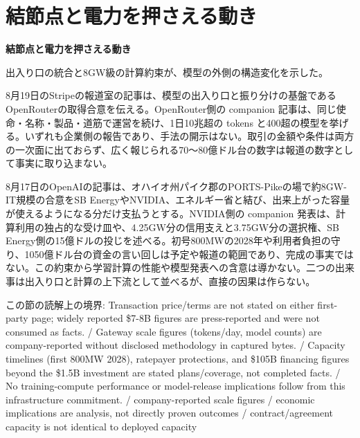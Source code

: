 \section{結節点と電力を押さえる動き}
\begin{wideflow}
{\Large\bfseries 結節点と電力を押さえる動き}\par
\smallskip
{\color{SurveyMuted}出入り口の統合と8GW級の計算約束が、模型の外側の構造変化を示した。}\par
\end{wideflow}

\noindent 8月19日のStripeの報道室の記事は、模型の出入り口と振り分けの基盤であるOpenRouterの取得合意を伝える。OpenRouter側の companion 記事は、同じ使命・名称・製品・道筋で運営を続け、1日10兆超の tokens と400超の模型を挙げる。いずれも企業側の報告であり、手法の開示はない。取引の金額や条件は両方の一次面に出ておらず、広く報じられる70〜80億ドル台の数字は報道の数字として事実に取り込まない。 \cite{w2026w34w34eventc003}\par\medskip

\noindent 8月17日のOpenAIの記事は、オハイオ州パイク郡のPORTS-Pikeの場で約8GW-IT規模の合意をSB EnergyやNVIDIA、エネルギー省と結び、出来上がった容量が使えるようになる分だけ支払うとする。NVIDIA側の companion 発表は、計算利用の独占的な受け皿や、4.25GW分の信用支えと3.75GW分の選択権、SB Energy側の15億ドルの投じを述べる。初号800MWの2028年や利用者負担の守り、1050億ドル台の資金の言い回しは予定や報道の範囲であり、完成の事実ではない。この約束から学習計算の性能や模型発表への含意は導かない。二つの出来事は出入り口と計算の上下流として並べるが、直接の因果は作らない。 \cite{w2026w34w34eventc026}\par\medskip

\begin{claimboundary}[読解上の境界]
この節の読解上の境界: Transaction price/terms are not stated on either first-party page; widely reported \$7-8B figures are press-reported and were not consumed as facts. / Gateway scale figures (tokens/day, model counts) are company-reported without disclosed methodology in captured bytes. / Capacity timelines (first 800MW 2028), ratepayer protections, and \$105B financing figures beyond the \$1.5B investment are stated plans/coverage, not completed facts. / No training-compute performance or model-release implications follow from this infrastructure commitment. / company-reported scale figures / economic implications are analysis, not directly proven outcomes / contract/agreement capacity is not identical to deployed capacity
\end{claimboundary}
